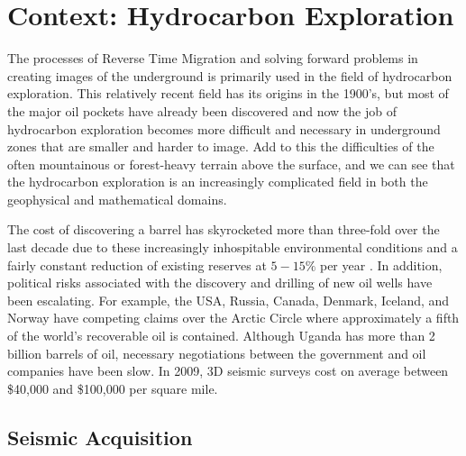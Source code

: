 \newpage
\section{Context: Hydrocarbon Exploration}

The processes of Reverse Time Migration and solving forward problems in creating images of the underground is primarily used in the field of hydrocarbon exploration. This relatively recent field has its origins in the 1900's, but most of the major oil pockets have already been discovered and now the job of hydrocarbon exploration becomes more difficult and necessary in underground zones that are smaller and harder to image. Add to this the difficulties of the often mountainous or forest-heavy terrain above the surface, and we can see that the hydrocarbon exploration is an increasingly complicated field in both the geophysical and mathematical domains. 

The cost of discovering a barrel has skyrocketed more than three-fold over the last decade due to these increasingly inhospitable environmental conditions and a fairly constant reduction of existing reserves at $5-15\%$ per year \cite{hydrocarbonExplorationCosts}. In addition, political risks associated with the discovery and drilling of new oil wells have been escalating. For example, the USA, Russia, Canada, Denmark, Iceland, and Norway have competing claims over the Arctic Circle where approximately a fifth of the world's recoverable oil is contained. Although Uganda has more than 2 billion barrels of oil, necessary negotiations between the government and oil companies have been slow. In 2009, 3D seismic surveys cost on average between \$40,000 and \$100,000 per square mile.

\subsection{Seismic Acquisition}

